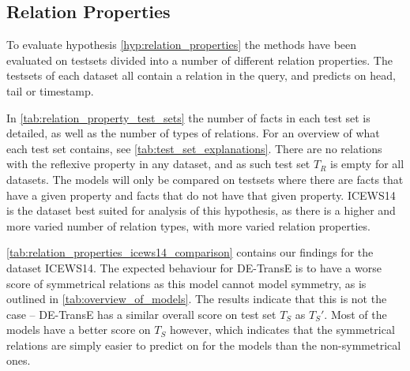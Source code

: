 \subsection{Relation Properties}
\label{sec:relation_properties_experiment}



%
%
%




To evaluate hypothesis \autoref{hyp:relation_properties} the methods have been evaluated on testsets divided into a number of different relation properties. The testsets of each dataset all contain a relation in the query, and predicts on head, tail or timestamp.

In \autoref{tab:relation_property_test_sets} the number of facts in each test set is detailed, as well as the number of types of relations.
For an overview of what each test set contains, see \autoref{tab:test_set_explanations}. There are no relations with the reflexive property in any dataset, and as such test set $T_R$ is empty for all datasets.
The models will only be compared on testsets where there are facts that have a given property and facts that do not have that given property. ICEWS14 is the dataset best suited for analysis of this hypothesis, as there is a higher and more varied number of relation types, with more varied relation properties.

\autoref{tab:relation_properties_icews14_comparison} contains our findings for the dataset ICEWS14. The expected behaviour for DE-TransE is to have a worse score of symmetrical relations as this model cannot model symmetry, as is outlined in \autoref{tab:overview_of_models}. The results indicate that this is not the case -- DE-TransE has a similar overall score on test set $T_S$ as $T_S'$. Most of the models have a better score on $T_S$ however, which indicates that the symmetrical relations are simply easier to predict on for the models than the non-symmetrical ones.

